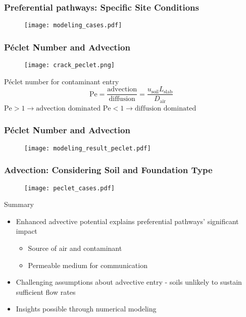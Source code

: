 \begin{frame}
  \frametitle{Preferential pathways: Specific Site Conditions}
  \begin{figure}
    \centering
    \texttt{[image: modeling\_cases.pdf]}
  \end{figure}
\end{frame}

\begin{frame}
  \frametitle{Péclet Number and Advection}
    \begin{figure}
      \texttt{[image: crack\_peclet.png]}
    \end{figure}
    \begin{block}{Péclet number for contaminant entry}
      \begin{equation*}
        \mathrm{Pe} = \frac{\mathrm{advection}}{\mathrm{diffusion}} = \frac{u_\mathrm{soil} L_\mathrm{slab}}{D_\mathrm{air}}
      \end{equation*}
      $\mathrm{Pe} > 1 \rightarrow \text{advection dominated}$ \hspace{1em}
      $\mathrm{Pe} < 1 \rightarrow \text{diffusion dominated}$
    \end{block}
\end{frame}

\begin{frame}
  \frametitle{Péclet Number and Advection}
    \begin{figure}
      \centering
      \texttt{[image: modeling\_result\_peclet.pdf]}
    \end{figure}
\end{frame}

\begin{frame}
  \frametitle{Advection: Considering Soil and Foundation Type}
    \begin{figure}
      \centering
      \texttt{[image: peclet\_cases.pdf]}
    \end{figure}
\end{frame}


\begin{frame}
  \begin{alertblock}{Summary}
    \begin{itemize}
      \item Enhanced advective potential explains preferential pathways' significant impact
      \begin{itemize}
        \item Source of air and contaminant
        \item Permeable medium for communication
      \end{itemize}
      \item Challenging assumptions about advective entry - soils unlikely to sustain sufficient flow rates
      \item Insights possible through numerical modeling
    \end{itemize}
  \end{alertblock}
\end{frame}



